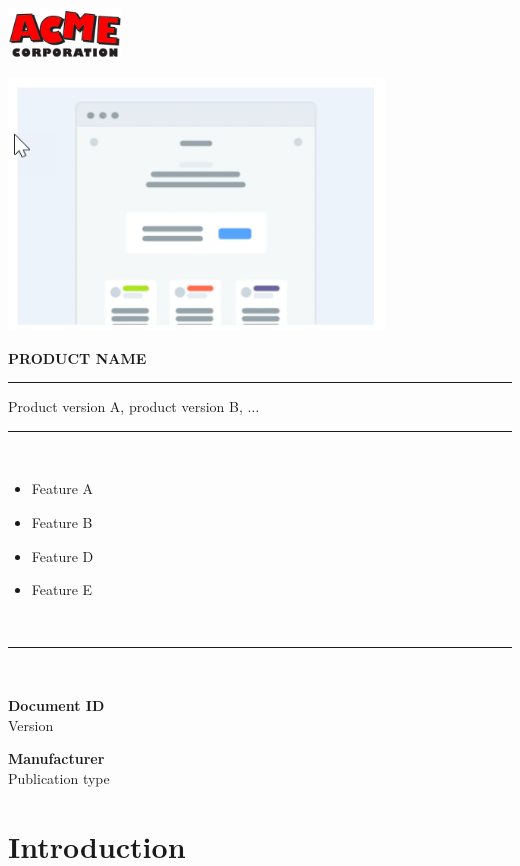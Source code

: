\documentclass[oneside]{book}
\begin{document}
	\begin{titlepage}
		\begin{flushright}
			\includegraphics[width=3cm]{Acme-corp.png}
		\end{flushright}
		\vfil
		\begin{center}
			\includegraphics[width=10cm]{logon.png}
		\end{center}
		\vfil
		\Huge
		\textbf{\uppercase{product name}} \\
		\rule{\textwidth}{1pt}
		\Large
		Product version A, product version B, $\ldots$\\
		\rule{\textwidth}{1pt}\\[0.5em]
		\begin{minipage}{0.5\textwidth}
			\begin{itemize}
				\item Feature A
				\item Feature B
			\end{itemize}
		\end{minipage}
		\hfill
		\begin{minipage}{0.5\textwidth}
			\begin{flushright}
				\begin{itemize}
					\item Feature D
					\item Feature E
				\end{itemize}
			\end{flushright}
		\end{minipage}
		\\[0.5em]
		\rule{\textwidth}{1pt}\\[0.5em]
		\begin{minipage}{0.5\textwidth}
			\begin{flushleft}
				\textbf{Document ID}\\
				Version
			\end{flushleft}
		\end{minipage}
		\hfill
		\begin{minipage}{0.5\textwidth}
			\begin{flushright}
				\textbf{Manufacturer}\\Publication type
			\end{flushright}		
		\end{minipage}
	\end{titlepage}
\chapter{Introduction}
\blindtext

\blindtext[2]
\end{document}
